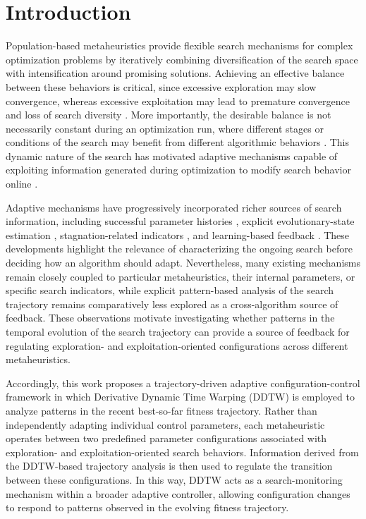 \documentclass[journal,article,submit,moreauthors]{Definitions/mdpi}
\begin{document}

\section{Introduction}

Population-based metaheuristics provide flexible search mechanisms for complex optimization problems by iteratively combining diversification of the search space with intensification around promising solutions. Achieving an effective balance between these behaviors is critical, since excessive exploration may slow convergence, whereas excessive exploitation may lead to premature convergence and loss of search diversity \cite{dhiman2026decade,vcrepinvsek2013exploration,zhang2019balancing}. More importantly, the desirable balance is not necessarily constant during an optimization run, where different stages or conditions of the search may benefit from different algorithmic behaviors \cite{vega2021learning,zhang2019balancing}. This dynamic nature of the search has motivated adaptive mechanisms capable of exploiting information generated during optimization to modify search behavior online \cite{aleti2016systematic}.

Adaptive mechanisms have progressively incorporated richer sources of search information, including successful parameter histories \cite{zhang2009jade}, explicit evolutionary-state estimation \cite{zhan2009adaptive}, stagnation-related indicators \cite{liu2024adaptive}, and learning-based feedback \cite{tatsis2023reinforcement}. These developments highlight the relevance of characterizing the ongoing search before deciding how an algorithm should adapt. Nevertheless, many existing mechanisms remain closely coupled to particular metaheuristics, their internal parameters, or specific search indicators, while explicit pattern-based analysis of the search trajectory remains comparatively less explored as a cross-algorithm source of feedback. These observations motivate investigating whether patterns in the temporal evolution of the search trajectory can provide a source of feedback for regulating exploration- and exploitation-oriented configurations across different metaheuristics.

Accordingly, this work proposes a trajectory-driven adaptive configuration-control framework in which Derivative Dynamic Time Warping (DDTW) is employed to analyze patterns in the recent best-so-far fitness trajectory. Rather than independently adapting individual control parameters, each metaheuristic operates between two predefined parameter configurations associated with exploration- and exploitation-oriented search behaviors. Information derived from the DDTW-based trajectory analysis is then used to regulate the transition between these configurations. In this way, DDTW acts as a search-monitoring mechanism within a broader adaptive controller, allowing configuration changes to respond to patterns observed in the evolving fitness trajectory.
\end{document}
